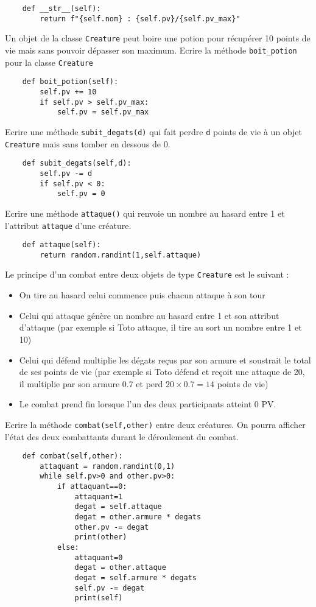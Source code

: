 \documentclass[11pt,a4paper]{article}
\begin{document}
\begin{lstlisting}
    def __str__(self):
        return f"{self.nom} : {self.pv}/{self.pv_max}"
\end{lstlisting}
\item Un objet de la classe {\tt Creature} peut boire une potion pour récupérer 10 points de vie mais sans pouvoir dépasser son maximum. Ecrire la méthode {\tt boit\_potion} pour la classe {\tt Creature}
\begin{lstlisting}
    def boit_potion(self):
        self.pv += 10
        if self.pv > self.pv_max:
            self.pv = self.pv_max
\end{lstlisting}
\item Ecrire une méthode {\tt subit\_degats(d)} qui fait perdre {\tt d} points de vie à un objet {\tt Creature} mais sans tomber en dessous de 0.
\begin{lstlisting}
    def subit_degats(self,d):
        self.pv -= d
        if self.pv < 0:
            self.pv = 0
\end{lstlisting}
\item Ecrire une méthode {\tt attaque()} qui renvoie un nombre au hasard entre 1 et l'attribut {\tt attaque} d'une créature.
\begin{lstlisting}
    def attaque(self):
        return random.randint(1,self.attaque)
\end{lstlisting}
\item Le principe d'un combat entre deux objets de type {\tt Creature} est le suivant :
\begin{itemize}
    \item[\ding{192}] On tire au hasard celui commence puis chacun attaque à son tour
    \item[\ding{193}] Celui qui attaque génère un nombre au hasard entre 1 et son attribut d'attaque (par exemple si Toto attaque, il tire au sort un nombre entre 1 et 10)
    \item[\ding{194}] Celui qui défend multiplie les dégats reçus par son armure et soustrait le total de ses points de vie (par exemple si Toto défend et reçoit une attaque de 20, il multiplie par son armure 0.7 et perd $20 \times 0.7=14$ points de vie)
    \item[\ding{195}] Le combat prend fin lorsque l'un des deux participants atteint 0 PV.
\end{itemize} 
Ecrire la méthode {\tt combat(self,other)} entre deux créatures. On pourra afficher l'état des deux combattants durant le déroulement du combat.
\begin{lstlisting}
    def combat(self,other):
        attaquant = random.randint(0,1)
        while self.pv>0 and other.pv>0:
            if attaquant==0:
                attaquant=1
                degat = self.attaque
                degat = other.armure * degats
                other.pv -= degat
                print(other)
            else:
                attaquant=0
                degat = other.attaque
                degat = self.armure * degats
                self.pv -= degat
                print(self)
\end{lstlisting}
\FinListe
\end{document}
